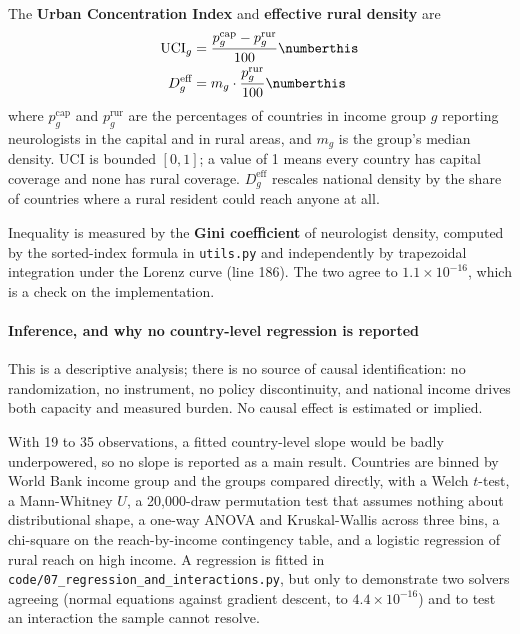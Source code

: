\documentclass[9pt,twoside]{pnas-new}
\begin{document}
The \textbf{Urban Concentration Index} and \textbf{effective rural density} are
%
\begin{align*}
\mathrm{UCI}_g &= \frac{p^{\text{cap}}_g - p^{\text{rur}}_g}{100} \numberthis \label{eqn:uci} \\
D^{\text{eff}}_g &= m_g \cdot \frac{p^{\text{rur}}_g}{100} \numberthis \label{eqn:erd}
\end{align*}
%
where $p^{\text{cap}}_g$ and $p^{\text{rur}}_g$ are the percentages of countries
in income group $g$ reporting neurologists in the capital and in rural areas,
and $m_g$ is the group's median density. UCI is bounded $[0,1]$; a value of 1
means every country has capital coverage and none has rural coverage.
$D^{\text{eff}}_g$ rescales national density by the share of countries where a
rural resident could reach anyone at all.

Inequality is measured by the \textbf{Gini coefficient} of neurologist density,
computed by the sorted-index formula in \texttt{utils.py} and
independently by trapezoidal integration under the Lorenz curve \cite{lorenz1905} (line 186). The
two agree to $1.1\times10^{-16}$, which is a check on the implementation.

\paragraph{Inference, and why no country-level regression is reported} This is
a descriptive analysis; there is no source of causal identification: no
randomization, no instrument, no policy discontinuity, and national income drives
both capacity and measured burden. No causal effect is estimated or implied.

With 19 to 35 observations, a fitted country-level slope would be badly
underpowered, so no slope is reported as a main result. Countries are binned
by World Bank income group and the groups compared directly, with a Welch
$t$-test, a Mann-Whitney $U$, a 20{,}000-draw permutation test \cite{good2005} that assumes
nothing about distributional shape, a one-way ANOVA and Kruskal-Wallis across
three bins, a chi-square on the reach-by-income contingency table, and a
logistic regression of rural reach on high income. A regression is fitted
in \texttt{code/07\_regression\_and\_interactions.py}, but only to demonstrate
two solvers agreeing (normal equations against gradient descent, to
$4.4\times10^{-16}$) and to test an interaction the sample cannot resolve.
\end{document}

